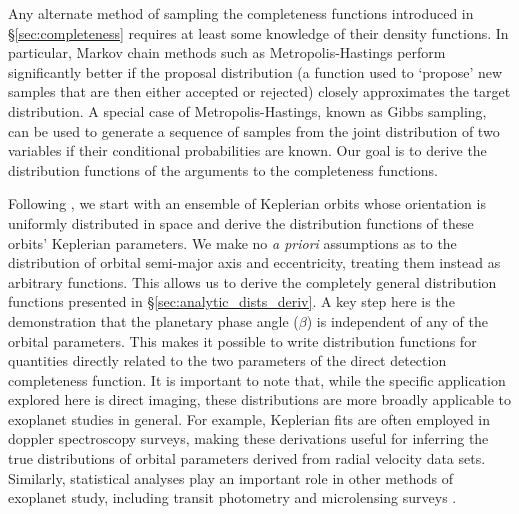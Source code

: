 Any alternate method of sampling the completeness functions introduced in \S\ref{sec:completeness} requires at least some knowledge of their density functions.  In particular, Markov chain methods such as Metropolis-Hastings \citep{hastings1970monte} perform significantly better if the proposal distribution (a function used to `propose' new samples that are then either accepted or rejected) closely approximates the target distribution.  A special case of Metropolis-Hastings, known as Gibbs sampling, can be used to generate a sequence of samples from the joint distribution of two variables if their conditional probabilities are known.  Our goal is to derive the distribution functions of the arguments to the completeness functions.

Following \citet{savransky2011parameter}, we start with an ensemble of Keplerian orbits whose orientation is uniformly distributed in space and derive the distribution functions of these orbits' Keplerian parameters. We make no \emph{a priori} assumptions as to the distribution of orbital semi-major axis and eccentricity, treating them instead as arbitrary functions.  This allows us to derive the completely general distribution functions presented in \S\ref{sec:analytic_dists_deriv}.  A key step here is the demonstration that the planetary phase angle ($\beta$) is independent of any of the orbital parameters.  This makes it possible to write distribution functions for quantities directly related to the two parameters of the direct detection completeness function.  It is important to note that, while the specific application explored here is direct imaging, these distributions are more broadly applicable to exoplanet studies in general.  For example, Keplerian fits are often employed in doppler spectroscopy surveys, making these derivations useful for inferring the true distributions of orbital parameters derived from radial velocity data sets.  Similarly, statistical analyses play an important role in other methods of exoplanet study, including transit photometry and microlensing surveys \citep{gould2010frequency}.

